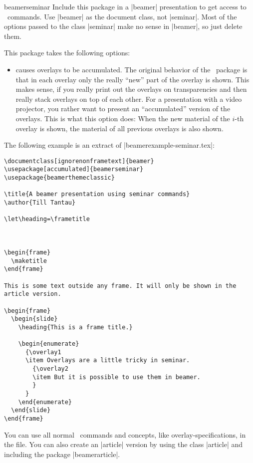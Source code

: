 \begin{package}{{beamerseminar}}
  Include this package in a |beamer| presentation to get access to \seminar\ commands. Use |beamer| as the document class, not |seminar|. Most of the options passed to the class |seminar| make no sense in |beamer|, so just delete them.

  This package takes the following options:
  \begin{itemize}
  \item
     causes overlays to be accumulated. The original behavior of the \seminar\ package is that in each overlay only the really ``new'' part of the overlay is shown. This makes sense, if you really print out the overlays on transparencies and then really stack overlays on top of each other. For a presentation with a video projector, you rather want to present an ``accumulated'' version of the overlays. This is what this option does: When the new material of the $i$-th overlay is shown, the material of all previous overlays is also shown.
  \end{itemize}

  \example
  The following example is an extract of |beamerexample-seminar.tex|:

\begin{verbatim}
\documentclass[ignorenonframetext]{beamer}
\usepackage[accumulated]{beamerseminar}
\usepackage{beamerthemeclassic}

\title{A beamer presentation using seminar commands}
\author{Till Tantau}

\let\heading=\frametitle



\begin{frame}
  \maketitle
\end{frame}

This is some text outside any frame. It will only be shown in the
article version.

\begin{frame}
  \begin{slide}
    \heading{This is a frame title.}

    \begin{enumerate}
      {\overlay1
      \item Overlays are a little tricky in seminar.
        {\overlay2
        \item But it is possible to use them in beamer.
        }
      }
    \end{enumerate}
  \end{slide}
\end{frame}

\end{verbatim}
  You can use all normal \beamer\ commands and concepts, like overlay-specifications, in the file. You can also create an |article| version by using the class |article| and including the package |beamerarticle|.
\end{package}

